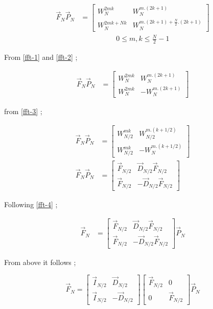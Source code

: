 \documentclass[journal,12pt,twocolumn]{IEEEtran}
\renewcommand\thesection{\arabic{section}}
\begin{document}
\begin{enumerate}[label=\arabic*.,ref=\thesection.\theenumi]
\begin{align}
	\vec{F}_{N}\vec{P}_{N}&=\begin{bmatrix}
		{W_{N}^{2mk}}&{W_{N}^{m.(2k+1)}}\\ {W_{N}^{2mk+Nk}}&{W_{N}^{m.(2k+1)+\frac{N}{2}.(2k+1)}}
	\end{bmatrix}  \nonumber \\
   &\quad \quad \quad \quad \quad 0 \le m,k \le \frac{N}{2}-1  \nonumber 	
\end{align}

From \eqref{fft-1} and \eqref{fft-2} ;

\begin{align}
	\vec{F}_{N}\vec{P}_{N}&=\begin{bmatrix}
		{W_{N}^{2mk}}&{W_{N}^{m.(2k+1)}}\\ {W_{N}^{2mk}}&-{W_{N}^{m.(2k+1)}}
	\end{bmatrix}  	
\end{align}
 
from \eqref{fft-3} ;

\begin{align}
	\vec{F}_{N}\vec{P}_{N}&=\begin{bmatrix}
		{W_{N/2}^{mk}}&{W_{N/2}^{m.(k+1/2)}}\\ {W_{N/2}^{mk}}&-{W_{N}^{m.(k+1/2)}}
	\end{bmatrix} 	\\
	\vec{F}_{N}\vec{P}_{N}&=\begin{bmatrix}
		\vec{F}_{N/2}&\vec{D}_{N/2}\vec{F}_{N/2}\\ \vec{F}_{N/2}&-\vec{D}_{N/2}\vec{F}_{N/2}
	\end{bmatrix}    	
\end{align}

Following \eqref{fft-4} ;

\begin{align}
	\vec{F}_{N}&=\begin{bmatrix}
		\vec{F}_{N/2}&\vec{D}_{N/2}\vec{F}_{N/2}\\ \vec{F}_{N/2}&-\vec{D}_{N/2}\vec{F}_{N/2}
	\end{bmatrix} \vec{P}_{N}   	
\end{align}

From above it follows ;

\begin{equation}
	\vec{F}_{N}=
	\begin{bmatrix}
		\vec{I}_{N/2} & \vec{D}_{N/2} \\
		\vec{I}_{N/2} & -\vec{D}_{N/2}
	\end{bmatrix}
	\begin{bmatrix}
		\vec{F}_{N/2} & 0 \\
		0 & \vec{F}_{N/2}
	\end{bmatrix}
	\vec{P}_{N}
\end{equation}


\end{enumerate}
\end{document}
